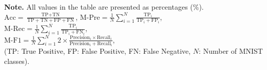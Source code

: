 \documentclass[conference]{IEEEtran}
\begin{document}
\begin{table}[ht]
\begin{tabular}{ l|l|l | c c c c }
\hline
\end{tabular}
\vspace{-2pt}   %
\begin{flushleft}
\begin{adjustwidth}{2pt}{2pt}  %
\textbf{Note.}
All values in the table are presented as percentages (\%).
$\text{Acc} = \frac{\text{TP} + \text{TN}}{\text{TP} + \text{TN} + \text{FP} + \text{FN}}$,
$\text{M-Pre} = \frac{1}{N} \sum_{i=1}^{N} \frac{\text{TP}_i}{\text{TP}_i + \text{FP}_i}$, \\
$\text{M-Rec} = \frac{1}{N} \sum_{i=1}^{N} \frac{\text{TP}_i}{\text{TP}_i + \text{FN}_i}$, \\
$\text{M-F1} = \frac{1}{N} \sum_{i=1}^{N} 2 \times \frac{\text{Precision}_i \times \text{Recall}_i}{\text{Precision}_i + \text{Recall}_i}$, \\

(TP: True Positive, FP: False Positive, FN: False Negative, $N$: Number of MNIST classes).
\end{adjustwidth}
\end{flushleft}

\label{tab:performance_comparison_scheme}
\end{table}
\end{document}
